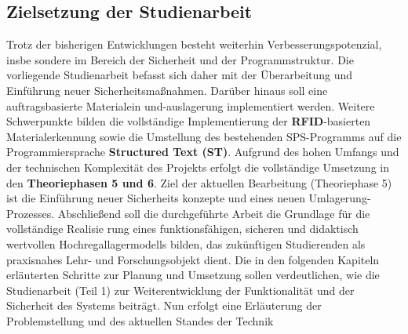 \subsection{Zielsetzung der Studienarbeit}
Trotz der bisherigen Entwicklungen besteht weiterhin Verbesserungspotenzial, insbe
sondere im Bereich der Sicherheit und der Programmstruktur.
Die vorliegende Studienarbeit befasst sich daher mit der Überarbeitung und Einführung
neuer Sicherheitsmaßnahmen. Darüber hinaus soll eine auftragsbasierte Materialein
und-auslagerung implementiert werden. Weitere Schwerpunkte bilden die vollständige
Implementierung der \textbf{RFID}-basierten Materialerkennung sowie die Umstellung des
bestehenden SPS-Programms auf die Programmiersprache \textbf{Structured Text (ST)}.
Aufgrund des hohen Umfangs und der technischen Komplexität des Projekts erfolgt die
vollständige Umsetzung in den \textbf{Theoriephasen 5 und 6}.
Ziel der aktuellen Bearbeitung (Theoriephase 5) ist die Einführung neuer Sicherheits
konzepte und eines neuen Umlagerung- Prozesses.
Abschließend soll die durchgeführte Arbeit die Grundlage für die vollständige Realisie
rung eines funktionsfähigen, sicheren und didaktisch wertvollen Hochregallagermodells
bilden, das zukünftigen Studierenden als praxisnahes Lehr- und Forschungsobjekt
dient.
Die in den folgenden Kapiteln erläuterten Schritte zur Planung und Umsetzung sollen
verdeutlichen, wie die Studienarbeit (Teil 1) zur Weiterentwicklung der Funktionalität und
der Sicherheit des Systems beiträgt. Nun erfolgt eine Erläuterung der Problemstellung
und des aktuellen Standes der Technik



